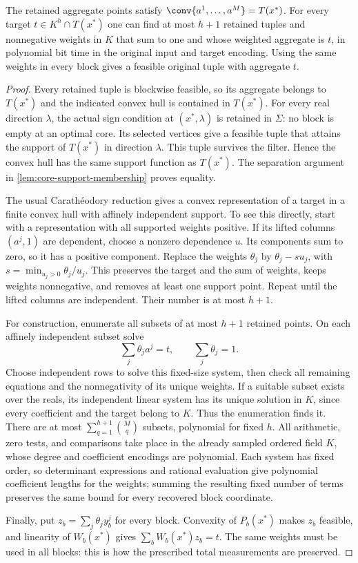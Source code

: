 \begin{lemma}
\label{lem:core-recovery}
The retained aggregate points satisfy
$\conv\{a^1,\ldots,a^M\}=T(x^*)$. For every target $t\in K^h\cap T(x^*)$
one can find at most $h+1$ retained tuples and nonnegative weights in $K$
that sum to one and whose weighted aggregate is $t$, in polynomial bit
time in the original input and target encoding. Using the same weights
in every block gives a feasible original tuple with aggregate $t$.
\end{lemma}
\begin{proof}
Every retained tuple is blockwise feasible, so its aggregate belongs to
$T(x^*)$ and the indicated convex hull is contained in $T(x^*)$.
For every real direction $\lambda$, the actual sign condition at
$(x^*,\lambda)$ is retained in $\Sigma$: no block is empty at an
optimal core. Its selected vertices give a feasible tuple that attains
the support of $T(x^*)$ in direction $\lambda$. This tuple survives
the filter. Hence the convex hull has the same support function as
$T(x^*)$. The separation argument in \cref{lem:core-support-membership}
proves equality.

The usual Carath\'eodory reduction gives a convex representation of
a target in a finite convex hull with affinely independent support. To see this directly, start with a
representation with all supported weights positive. If its lifted
columns $(a^j,1)$ are dependent, choose a nonzero dependence $u$.
Its components sum to zero, so it has a positive component. Replace
the weights $\theta_j$ by $\theta_j-su_j$, with
$s=\min_{u_j>0}\theta_j/u_j$. This preserves the target and the sum
of weights, keeps weights nonnegative, and removes at least one support
point. Repeat until the lifted columns are independent. Their number
is at most $h+1$.

For construction, enumerate all subsets of at most $h+1$ retained
points. On each affinely independent subset solve
\[
          \sum_j\theta_j a^j=t,\qquad \sum_j\theta_j=1.
\]
Choose independent rows to solve this fixed-size system, then check
all remaining equations and the nonnegativity of its unique weights.
If a suitable subset exists over the reals, its independent linear
system has its unique solution in $K$, since every coefficient and the
target belong to $K$. Thus the enumeration finds it. There are at most
$\sum_{q=1}^{h+1}\binom Mq$ subsets, polynomial for fixed $h$.
All arithmetic, zero tests, and comparisons take place in the already
sampled ordered field $K$, whose degree and coefficient encodings are
polynomial. Each system has fixed order, so determinant expressions
and rational evaluation give polynomial coefficient lengths for the
weights; summing the resulting fixed number of terms preserves the
same bound for every recovered block coordinate.

Finally, put $z_b=\sum_j\theta_j y_b^j$ for every block. Convexity
of $P_b(x^*)$ makes $z_b$ feasible, and linearity of $W_b(x^*)$ gives
$\sum_bW_b(x^*)z_b=t$. The same weights must be used in all blocks:
this is how the prescribed total measurements are preserved.
\end{proof}

